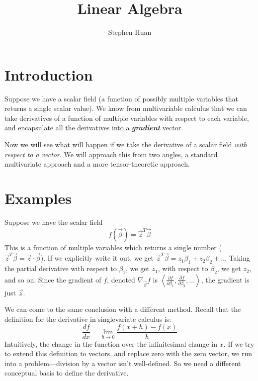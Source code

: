 \documentclass[11pt, oneside]{article}
\title{Linear Algebra}
\author{Stephen Huan}
\newcommand{\emphasis}[1]{\textbf{\textit{#1}}}
\begin{document}
\maketitle

\section{Introduction}
Suppose we have a scalar field (a function of possibly multiple variables that
returns a single scalar value). We know from multivariable calculus that we can
take derivatives of a function of multiple variables with respect to each
variable, and encapsulate all the derivatives into a \emphasis{gradient} vector.

Now we will see what will happen if we take the derivative of a scalar field
\textit{with respect to a vector}. We will approach this from two angles,
a standard multivariate approach and a more tensor-theoretic approach.

\section{Examples}

Suppose we have the scalar field \[ f(\vec{\beta}) = \vec{z}^T \vec{\beta} \]
This is a function of multiple variables which returns a single number
(\( \vec{z}^T \vec{\beta} = \vec{z} \cdot \vec{\beta} \)).
If we explicitly write it out, we get
\( \vec{z}^T \vec{\beta} = z_1 \beta_1 + z_2 \beta_2 + \dots \)
Taking the partial derivative with respect to \( \beta_1 \), we get
\( z_1 \), with respect to \( \beta_2 \), we get \( z_2 \), and so on.
Since the gradient of \( f \), denoted \( \nabla_{\vec{\beta}} f \) is
\( \left\langle \frac{\partial f}{\partial \beta_1}, \frac{\partial f}{\partial \beta_2}, \ldots \right\rangle \),
the gradient is just \( \vec{z} \).

We can come to the same conclusion with a different method.
Recall that the definition for the derivative in singlevariate calculus is:
\[ \frac{df}{dx} = \lim_{h \to 0} \frac{f(x + h) - f(x)}{h} \]
Intuitively, the change in the function
over the infinitesimal change in \( x \).
If we try to extend this definition to vectors, and replace zero with the zero
vector, we run into a problem---division by a vector isn't well-defined.
So we need a different conceptual basis to define the derivative.

\newpage
\end{document}
